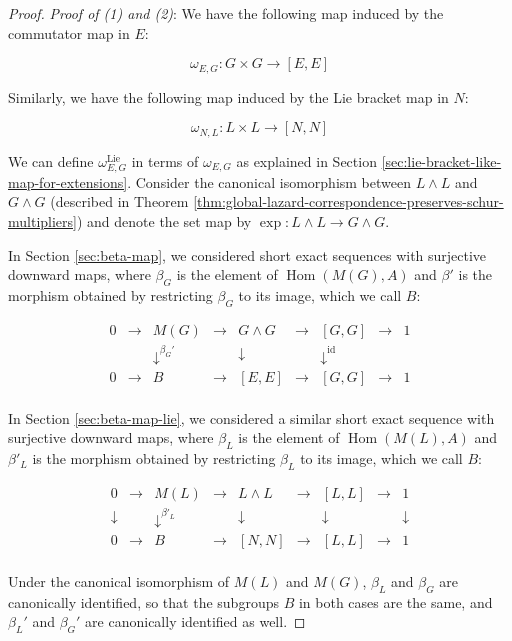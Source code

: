 \begin{proof}
  {\em Proof of (1) and (2)}: We have the following map induced by the
  commutator map in $E$:

  $$\omega_{E,G}: G \times G \to [E,E]$$

  Similarly, we have the following map induced by the Lie bracket map
  in $N$:

  $$\omega_{N,L}: L \times L \to [N,N]$$

  We can define $\omega_{E,G}^{\text{Lie}}$ in terms of $\omega_{E,G}$
  as explained in Section
  \ref{sec:lie-bracket-like-map-for-extensions}. Consider the
  canonical isomorphism between $L \wedge L$ and $G \wedge G$
  (described in Theorem
  \ref{thm:global-lazard-correspondence-preserves-schur-multipliers})
  and denote the set map by $\exp:L \wedge L \to G \wedge G$.

  In Section \ref{sec:beta-map}, we
  considered short exact sequences with surjective downward maps,
  where $\beta_G$ is the element of $\operatorname{Hom}(M(G),A)$ and
  $\beta'$ is the morphism obtained by restricting $\beta_G$ to its
  image, which we call $B$:

  $$\begin{array}{ccccccccc}
    0 & \to & M(G) & \to & G \wedge G & \to & [G,G] & \to & 1\\
    &&   \downarrow^{\beta_G'}  &&  \downarrow     && \downarrow^{\text{id}} && \\
    0 & \to & B &\to & [E,E] & \to & [G,G] & \to & 1\\
  \end{array}$$

  In Section \ref{sec:beta-map-lie}, we considered a similar short
  exact sequence with surjective downward maps, where $\beta_L$ is the
  element of $\operatorname{Hom}(M(L),A)$ and $\beta'_L$ is the
  morphism obtained by restricting $\beta_L$ to its image, which we
  call $B$:

  $$\begin{array}{ccccccccc}
    0 & \to & M(L) & \to & L \wedge L & \to & [L,L] & \to & 1\\
    \downarrow &&   \downarrow^{\beta'_L}  &&  \downarrow     && \downarrow&& \downarrow\\
    0 & \to & B &\to & [N,N] & \to & [L,L] & \to & 1\\
  \end{array}$$

  Under the canonical isomorphism of $M(L)$ and $M(G)$, $\beta_L$ and
  $\beta_G$ are canonically identified, so that the subgroups $B$ in
  both cases are the same, and $\beta_L'$ and $\beta_G'$ are
  canonically identified as well.


\end{proof}
